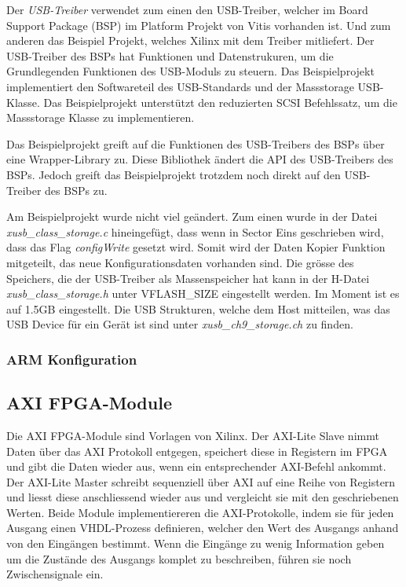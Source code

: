 \documentclass{article}
\begin{document}
Der \textit{USB-Treiber} verwendet zum einen den USB-Treiber, welcher im Board Support Package (BSP) im Platform Projekt von Vitis vorhanden ist. Und zum anderen das Beispiel Projekt, welches Xilinx mit dem Treiber mitliefert. Der USB-Treiber des BSPs hat Funktionen und Datenstrukuren, um die Grundlegenden Funktionen des USB-Moduls zu steuern. Das Beispielprojekt implementiert den Softwareteil des USB-Standards und der Massstorage USB-Klasse. Das Beispielprojekt unterstützt den reduzierten SCSI Befehlssatz, um die Massstorage Klasse zu implementieren.

Das Beispielprojekt greift auf die Funktionen des USB-Treibers des BSPs über eine Wrapper-Library zu. Diese Bibliothek ändert die API des USB-Treibers des BSPs. Jedoch greift das Beispielprojekt trotzdem noch direkt auf den USB-Treiber des BSPs zu. 

Am Beispielprojekt wurde nicht viel geändert. Zum einen wurde in der Datei \textit{xusb\_class\_storage.c} hineingefügt, dass wenn in Sector Eins geschrieben wird, dass das Flag \textit{configWrite} gesetzt wird. Somit wird der Daten Kopier Funktion mitgeteilt, das neue Konfigurationsdaten vorhanden sind. Die grösse des Speichers, die der USB-Treiber als Massenspeicher hat kann in der H-Datei \textit{xusb\_class\_storage.h} unter VFLASH\_SIZE eingestellt werden. Im Moment ist es auf 1.5GB eingestellt.
Die USB Strukturen, welche dem Host mitteilen, was das USB Device für ein Gerät ist sind unter \textit{xusb\_ch9\_storage.ch} zu finden.
\subsubsection*{ARM Konfiguration}

\subsection{AXI FPGA-Module}
\label{sec:axi}
Die AXI FPGA-Module sind Vorlagen von Xilinx. Der AXI-Lite Slave nimmt Daten über das AXI Protokoll entgegen, speichert diese in Registern im FPGA und gibt die Daten wieder aus, wenn ein entsprechender AXI-Befehl ankommt. Der AXI-Lite Master schreibt sequenziell über AXI auf eine Reihe von Registern und liesst diese anschliessend wieder aus und vergleicht sie mit den geschriebenen Werten. Beide Module implementiereren die AXI-Protokolle, indem sie für jeden Ausgang einen VHDL-Prozess definieren, welcher den Wert des Ausgangs anhand von den Eingängen bestimmt. Wenn die Eingänge zu wenig Information geben um die Zustände des Ausgangs komplet zu beschreiben, führen sie noch Zwischensignale ein.
\end{document}
